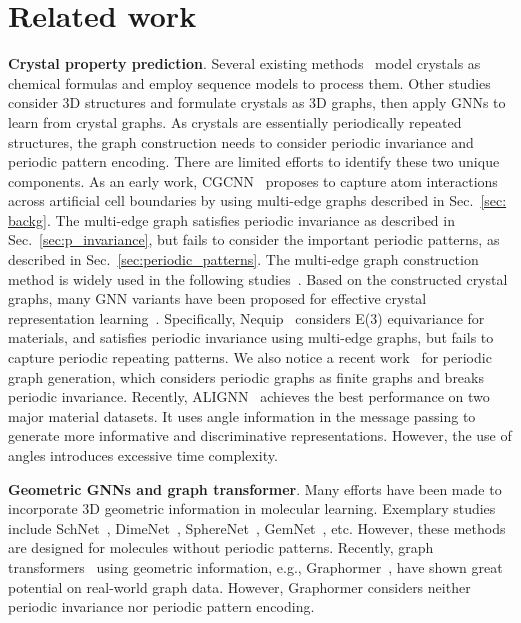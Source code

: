 \documentclass{article}
\begin{document}
\section{Related work}
\textbf{Crystal property prediction}. Several existing methods~\citep{crabnet, jha2018elemnet, jha2019irnet, goodall2020predicting} model crystals as chemical formulas and employ sequence models to process them. Other studies~\citep{cgcnn, cyatt, gatgnn, megnet, schnet,alignn} consider 3D structures and formulate crystals as 3D graphs, then apply GNNs to learn from crystal graphs.
As crystals are essentially periodically repeated structures, the graph construction needs to consider periodic invariance and periodic pattern encoding. 
There are limited efforts to identify these two unique components. As an early work, CGCNN~\citep{cgcnn} proposes to capture atom interactions across artificial cell boundaries by using multi-edge graphs described in Sec.~\ref{sec: backg}. The multi-edge graph satisfies periodic invariance as described in Sec.~\ref{sec:p_invariance}, but fails to consider the important periodic patterns, as described in Sec.~\ref{sec:periodic_patterns}. The multi-edge graph construction method is widely used in the following studies~\citep{cyatt, gatgnn, megnet, schnet,alignn, nequip}. Based on the constructed crystal graphs, many GNN variants have been proposed for effective crystal representation learning~\citep{cgcnn, cyatt, gatgnn, megnet, schnet,alignn, nequip}. 
Specifically, Nequip~\citep{nequip} considers E(3) equivariance for materials, and satisfies periodic invariance using multi-edge graphs, but fails to capture periodic repeating patterns.
We also notice a recent work~\citep{wang2022deep_gen_perio} for periodic graph generation, which considers periodic graphs as finite graphs and breaks periodic invariance.
Recently, ALIGNN~\citep{alignn} achieves the best performance on two major material datasets.
It uses angle information in the message passing to generate more informative and discriminative representations.
However, the use of angles introduces excessive time complexity.

\textbf{Geometric GNNs and graph transformer}. Many efforts have been made to incorporate 3D geometric information in molecular learning.
Exemplary studies include SchNet~\citep{schnet}, DimeNet~\citep{Dimenet,klicpera2020fast}, SphereNet~\citep{liu2021spherical}, GemNet~\citep{klicpera2021gemnet}, etc. 
However, these methods are designed for molecules without periodic patterns. Recently, graph transformers~\citep{graphormer, fuchs2020se} using geometric information, e.g., Graphormer~\citep{graphormer}, have shown great potential on real-world graph data. 
However, Graphormer considers neither periodic invariance nor periodic pattern encoding.
\end{document}
